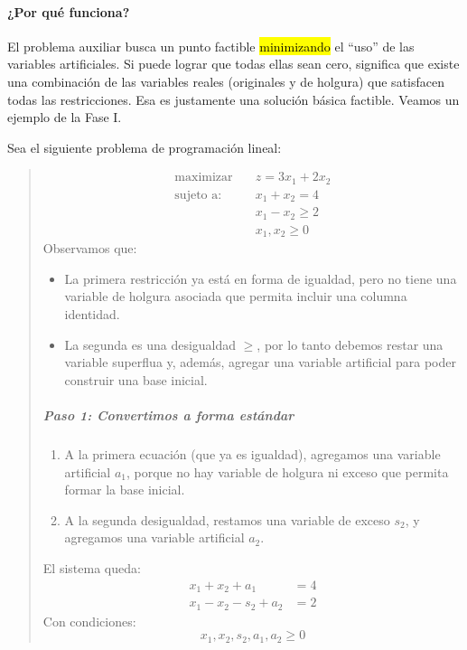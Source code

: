 \paragraph{¿Por qué funciona?}

El problema auxiliar busca un punto factible \hl{minimizando} el ``uso'' de las variables artificiales. Si puede lograr que todas ellas sean cero, significa que existe una combinación de las variables reales (originales y de holgura) que satisfacen todas las restricciones. Esa es justamente una solución básica factible. Veamos un ejemplo de la Fase I.

\ejemplo\label{ej:fase_1} Sea el siguiente problema de programación lineal:
\begin{quote}
  \begin{align*}
    \text{maximizar} \quad  &z = 3x_1 + 2x_2\\[3pt]
    \text{sujeto a:} \quad  &x_1 + x_2 = 4\\
                            &x_1 - x_2 \geq 2\\
                            &x_1, x_2 \geq 0
  \end{align*}
  Observamos que:
  \begin{itemize}
    \item La primera restricción ya está en forma de igualdad, pero no tiene una variable de holgura asociada que permita incluir una columna identidad.
    \item La segunda es una desigualdad \(\geq\), por lo tanto debemos restar una variable superflua y, además, agregar una variable artificial para poder construir una base inicial.
  \end{itemize}
  
  \subparagraph{Paso 1: Convertimos a forma estándar}
  \begin{enumerate}
    \item A la primera ecuación (que ya es igualdad), agregamos una variable artificial \(a_1\), porque no hay variable de holgura ni exceso que permita formar la base inicial.
    \item A la segunda desigualdad, restamos una variable de exceso \(s_2\), y agregamos una variable artificial \(a_2\).
  \end{enumerate}
  El sistema queda:
  \begin{align*}
    x_1 + x_2 + a_1 &= 4\\
    x_1 - x_2 - s_2 + a_2 &= 2
  \end{align*}  
  Con condiciones:
  \[
    x_1, x_2, s_2, a_1, a_2 \geq 0
  \]


\end{quote}
